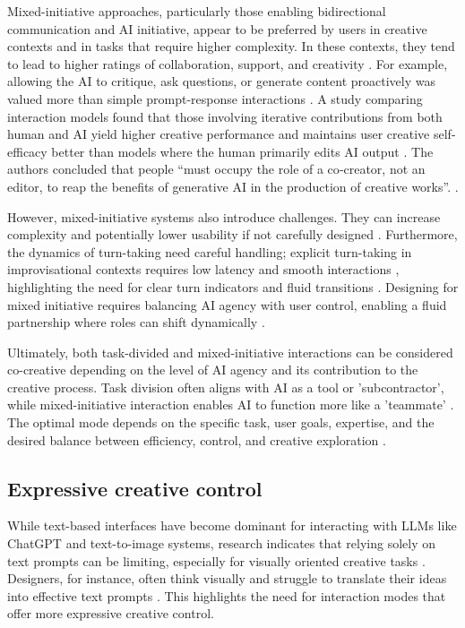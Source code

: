 Mixed-initiative approaches, particularly those enabling bidirectional communication and AI initiative, appear to be preferred by users in creative contexts and in tasks that require higher complexity. In these contexts, they tend to lead to higher ratings of collaboration, support, and creativity \citep{Lin2023-jd}. For example, allowing the AI to critique, ask questions, or generate content proactively was valued more than simple prompt-response interactions \citep{Lin2023-jd}. A study comparing interaction models found that those involving iterative contributions from both human and AI yield higher creative performance and maintains user creative self-efficacy better than models where the human primarily edits AI output \citep{McGuire2024-im}. The authors concluded that people ``must occupy the role of a co‑creator, not an editor, to reap the benefits of generative AI in the production of creative works''. \citep{McGuire2024-im}.

However, mixed-initiative systems also introduce challenges. They can increase complexity and potentially lower usability if not carefully designed \citep{Lin2023-jd}. Furthermore, the dynamics of turn-taking need careful handling; explicit turn-taking in improvisational contexts requires low latency and smooth interactions \citep{Winston2017-nb}, highlighting the need for clear turn indicators and fluid transitions \citep{Shakeri2021-dx}. Designing for mixed initiative requires balancing AI agency with user control, enabling a fluid partnership where roles can shift dynamically \citep{Zhou2024-vp, Lawton2023-gd}.

Ultimately, both task-divided and mixed-initiative interactions can be considered co-creative depending on the level of AI agency and its contribution to the creative process. Task division often aligns with AI as a tool or 'subcontractor', while mixed-initiative interaction enables AI to function more like a 'teammate' \citep{Lin2023-zq}. The optimal mode depends on the specific task, user goals, expertise, and the desired balance between efficiency, control, and creative exploration \citep{Moruzzi2024-cq, Ding2024-ja, Weisz2024-io}.

\subsection{Expressive creative control}

While text-based interfaces have become dominant for interacting with LLMs like ChatGPT and text-to-image systems, research indicates that relying solely on text prompts can be limiting, especially for visually oriented creative tasks \citep{Park2024-gw, Tholander2023-rv, Verheijden2023-gn}. Designers, for instance, often think visually and struggle to translate their ideas into effective text prompts \citep{Park2024-gw, Peng2024-tr}. This highlights the need for interaction modes that offer more expressive creative control. 

